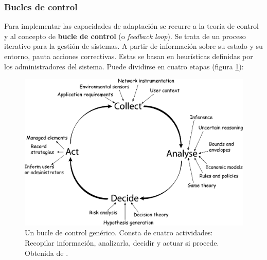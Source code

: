 \subsubsection{Bucles de control}

Para implementar las capacidades de adaptación se recurre a la teoría de control y al concepto de \textbf{bucle de control} (o \emph{feedback loop}). \cite{brunEngineeringSelfAdaptiveSystems2009} Se trata de un proceso iterativo para la gestión de sistemas. A partir de información sobre su estado y su entorno, pauta acciones correctivas. Estas se basan en heurísticas definidas por los administradores del sistema. Puede dividirse en cuatro etapas (figura \ref{fig:bucle-control}):

\begin{figure}[h]
  \centering
  \includegraphics[scale=0.065]{cap_introduccion/images/feedback-loop}
  \caption[Un bucle de control genérico. Consta de cuatro actividades: Recopilar información, analizarla, decidir y actuar si procede.]{Un bucle de control genérico. Consta de cuatro actividades: Recopilar información, analizarla, decidir y actuar si procede. Obtenida de \cite{dobsonSurveyAutonomicCommunications2006}.}
  \label{fig:bucle-control}
\end{figure}

